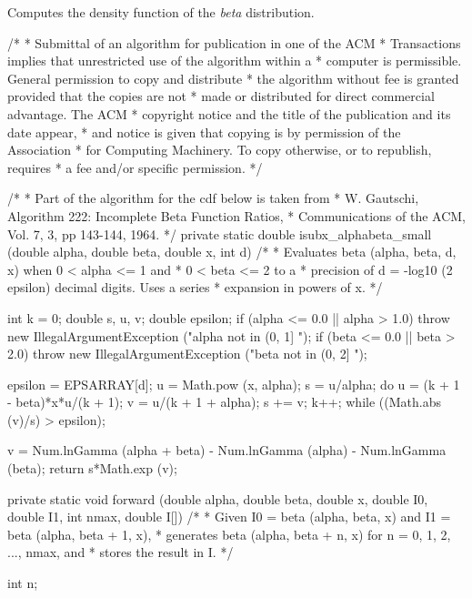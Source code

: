 \begin{tabb} Computes the density function of the {\em beta\/} distribution.
\end{tabb}
\begin{code}\begin{hide}

/*
 *    Submittal of an algorithm for publication in one of the  ACM
 *    Transactions implies that unrestricted use of the algorithm within a
 *    computer is permissible. General permission to copy and distribute
 *    the algorithm without fee is granted provided that the copies are not
 *    made or distributed for direct commercial  advantage. The ACM
 *    copyright notice and the title of the publication and its date appear,
 *    and  notice is given that copying is by permission of the Association
 *    for Computing Machinery. To copy otherwise, or to republish, requires
 *    a fee and/or specific permission.
 */

/*
 * Part of the algorithm for the cdf below is taken from
 *     W. Gautschi, Algorithm 222: Incomplete Beta Function Ratios,
 *     Communications of the ACM, Vol. 7, 3, pp 143-144, 1964.
 */
   private static double isubx_alphabeta_small (double alpha, double beta,
                                                double x, int d)
   /*
    * Evaluates beta (alpha, beta, d, x) when 0 < alpha <= 1 and
    * 0 < beta <= 2 to a
    * precision of d = -log10 (2 epsilon) decimal digits. Uses a series
    * expansion in powers of x.
    */
   {
      int k = 0;
      double s, u, v;
      double epsilon;
      if (alpha <= 0.0 || alpha > 1.0)
        throw new IllegalArgumentException ("alpha not in (0, 1] ");
      if (beta <= 0.0 || beta > 2.0)
        throw new IllegalArgumentException ("beta not in (0, 2] ");

      epsilon = EPSARRAY[d];
      u = Math.pow (x, alpha);
      s = u/alpha;
      do {
         u = (k + 1 - beta)*x*u/(k + 1);
         v = u/(k + 1 + alpha);
         s += v;
         k++;
      } while ((Math.abs (v)/s) > epsilon);

      v = Num.lnGamma (alpha + beta) - Num.lnGamma (alpha) - Num.lnGamma (beta);
      return s*Math.exp (v);
   }

   private static void forward (double alpha, double beta, double x,
                                double I0, double I1, int nmax, double I[])
   /*
    * Given I0 = beta (alpha, beta, x) and I1 = beta (alpha, beta + 1, x),
    * generates beta (alpha, beta + n, x) for n = 0, 1, 2, ..., nmax, and
    * stores the result in I.
    */
   {
      int n;

}
\end{hide}
\end{code}
